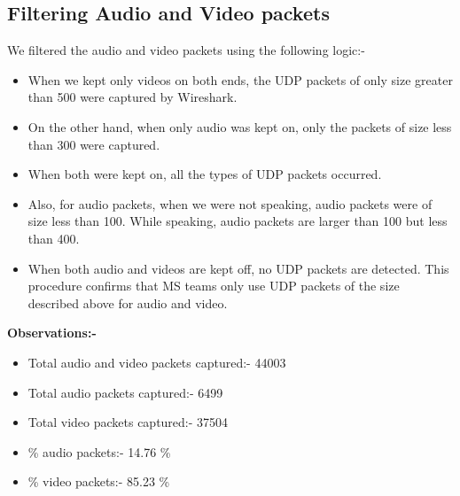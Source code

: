 \documentclass{article}
\begin{document}
\subsection{Filtering Audio and Video packets}
We filtered the audio and video packets using the following logic:-
\begin{itemize}
    \item When we kept only videos on both ends, the UDP packets of only size greater than 500 were captured by Wireshark.
    \item On the other hand, when only audio was kept on, only the packets of size less than 300 were captured.
    \item When both were kept on, all the types of UDP packets occurred.
    \item Also, for audio packets, when we were not speaking, audio packets were of size less than 100. While speaking, audio packets are larger than 100 but less than 400.
    \item When both audio and videos are kept off, no UDP packets are detected. This procedure confirms that MS teams only use UDP packets of the size described above for audio and video.
\end{itemize}

\textbf{Observations:-} 
\begin{itemize}
    \item Total audio and video packets captured:- 44003
    \item Total audio packets captured:- 6499
    \item Total video packets captured:- 37504
    \item \% audio packets:- 14.76 \%
    \item \% video packets:- 85.23 \%
\end{itemize}
\end{document}

